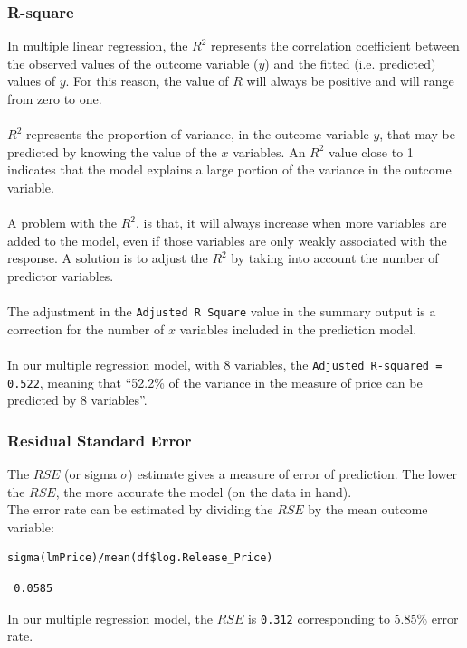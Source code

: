 \documentclass[a4paper]{article}
\begin{document}
\subsubsection{R-square}
In multiple linear regression, the $R^2$ represents the correlation coefficient between the observed values of the outcome variable ($y$) and the fitted (i.e. predicted) values of $y$. For this reason, the value of $R$ will always be positive and will range from zero to one.\\\\
$R^2$ represents the proportion of variance, in the outcome variable $y$, that may be predicted by knowing the value of the $x$ variables. An $R^2$ value close to 1 indicates that the model explains a large portion of the variance in the outcome variable.\\\\
A problem with the $R^2$, is that, it will always increase when more variables are added to the model, even if those variables are only weakly associated with the response. A solution is to adjust the $R^2$ by taking into account the number of predictor variables.\\\\
The adjustment in the \verb|Adjusted R Square| value in the summary output is a correction for the number of $x$ variables included in the prediction model.\\\\
In our multiple regression model, with 8 variables, the \verb|Adjusted R-squared = 0.522|, meaning that “52.2\% of the variance in the measure of price can be predicted by 8 variables”.
\subsubsection{Residual Standard Error}
The $RSE$ (or sigma $\sigma$) estimate gives a measure of error of prediction. The lower the $RSE$, the more accurate the model (on the data in hand).\\
The error rate can be estimated by dividing the $RSE$ by the mean outcome variable:
\begin{mdframed}[leftline=false,rightline=false,backgroundcolor=lightblue!10,nobreak=false]
    \begin{verbatim}
sigma(lmPrice)/mean(df$log.Release_Price)
    \end{verbatim}
\end{mdframed}

\begin{lstlisting}
 0.0585
\end{lstlisting}
In our multiple regression model, the $RSE$ is \verb|0.312|  corresponding to 5.85\% error rate.
\end{document}
